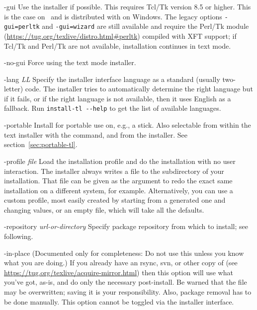 \documentclass{article}
\begin{document}
\begin{ttdescription}
\item[-gui] Use the \GUI{} installer if possible. This requires
  Tcl/Tk version 8.5 or higher. This is the case on \MacOSX\ and is
  distributed with \TL{} on Windows. The legacy options
  \texttt{-gui=perltk} and \texttt{-gui=wizard} are still available
  and require the Perl/Tk module
  (\url{https://tug.org/texlive/distro.html#perltk}) compiled with
  XFT support; if Tcl/Tk and Perl/Tk are not available, installation
  continues in text mode.

\item[-no-gui] Force using the text mode installer.

\item[-lang {\sl LL}] Specify the installer interface
  language as a standard (usually two-letter) code.  The installer tries
  to automatically determine the right language but if it fails, or if
  the right language is not available, then it uses English as a
  fallback.  Run \verb|install-tl --help| to get the list of available
  languages.

\item[-portable] Install for portable use on, e.g., a \USB{} stick.
  Also selectable from within the text installer with the 
  command, and from the \GUI{} installer.  See
  section~\ref{sec:portable-tl}.

\item[-profile {\sl file}] Load the installation profile  and
  do the installation with no user interaction.  The installer always
  writes a file  to the 
  subdirectory of your installation.  That file can be given as the
  argument to redo the exact same installation on a different system,
  for example.  Alternatively, you can use a custom profile, most easily
  created by starting from a generated one and changing values, or an
  empty file, which will take all the defaults.

\item [-repository {\sl url-or-directory}] Specify package
  repository from which to install; see following.

\item[-in-place] (Documented only for completeness: Do not use this
  unless you know what you are doing.) If you already have an rsync, svn,
  or other copy of \TL{} (see
  \url{https://tug.org/texlive/acquire-mirror.html}) then this option
  will use what you've got, as-is, and do only the necessary
  post-install.  Be warned that the file 
  may be overwritten; saving it is your responsibility.  Also, package
  removal has to be done manually. This option cannot be toggled via the
  installer interface.
\end{ttdescription}
\end{document}
